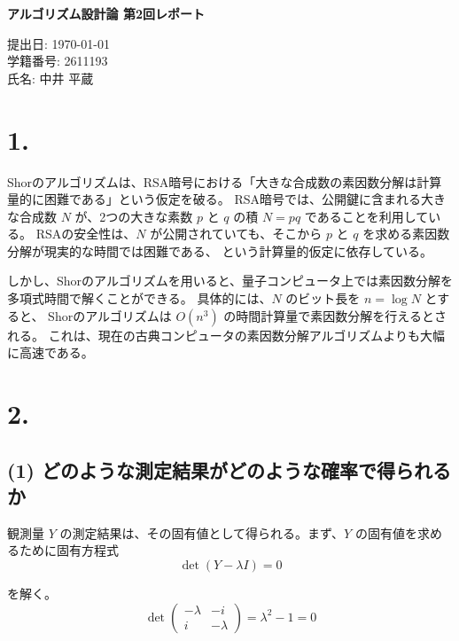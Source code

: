 \documentclass[11pt,a4paper]{ltjsarticle}
\begin{document}
\begin{center}
{\LARGE \textbf{アルゴリズム設計論 第2回レポート}}
\end{center}
\vspace{1em}

\begin{flushright}
提出日: \today \\
学籍番号: 2611193 \\
氏名: 中井 平蔵
\end{flushright}

\section*{1.}
Shorのアルゴリズムは、RSA暗号における「大きな合成数の素因数分解は計算量的に困難である」という仮定を破る。
RSA暗号では、公開鍵に含まれる大きな合成数 $N$ が、2つの大きな素数 $p$ と $q$ の積 $N = pq$ であることを利用している。
RSAの安全性は、$N$ が公開されていても、そこから $p$ と $q$ を求める素因数分解が現実的な時間では困難である、
という計算量的仮定に依存している。

しかし、Shorのアルゴリズムを用いると、量子コンピュータ上では素因数分解を多項式時間で解くことができる。
具体的には、$N$ のビット長を $n = \log N$ とすると、
Shorのアルゴリズムは $O(n^3)$ の時間計算量で素因数分解を行えるとされる。
これは、現在の古典コンピュータの素因数分解アルゴリズムよりも大幅に高速である。

\begin{center}
\end{center}

\section*{2.}
\subsection*{(1) どのような測定結果がどのような確率で得られるか}
観測量 $Y$ の測定結果は、その固有値として得られる。まず、$Y$ の固有値を求めるために固有方程式
\[
\det(Y - \lambda I) = 0
\]

を解く。
\[
\det \begin{pmatrix}
-\lambda & -i \\
i & -\lambda
\end{pmatrix}
= \lambda^2 - 1 = 0
\]
\end{document}
